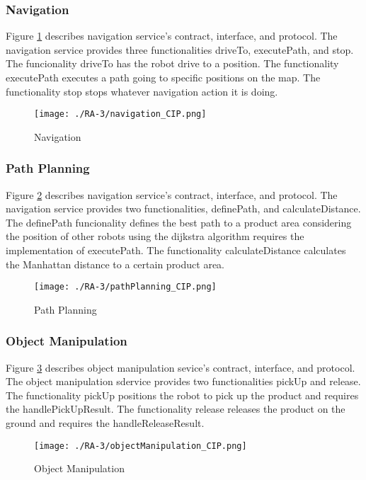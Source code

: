 \subsubsection{Navigation} %
Figure \ref{fig:navigation_cip} describes navigation service's contract, interface, and protocol. The navigation service provides three functionalities driveTo, executePath, and stop. The funcionality driveTo has the robot drive to a position. The functionality executePath executes a path going to specific positions on the map. The functionality stop stops whatever navigation action it is doing.
\begin{figure}[ht!]
 \centering
 \texttt{[image: ./RA-3/navigation\_CIP.png]}
 \caption{Navigation}
 \label{fig:navigation_cip}
\end{figure}

\subsubsection{Path Planning} %
Figure \ref{fig:pathplanning_cip} describes navigation service's contract, interface, and protocol. The navigation service provides two functionalities, definePath, and calculateDistance. The definePath funcionality defines the best path to a product area considering the position of other robots using the dijkstra algorithm requires the implementation of executePath. The functionality calculateDistance calculates the Manhattan distance to a certain product area.
\begin{figure}[ht!]
 \centering
 \texttt{[image: ./RA-3/pathPlanning\_CIP.png]}
 \caption{Path Planning}
 \label{fig:pathplanning_cip}
\end{figure}

\subsubsection{Object Manipulation} %
Figure \ref{fig:objectmanipulation_cip} describes object manipulation sevice's contract, interface, and protocol. The object manipulation sdervice provides two functionalities pickUp and release. The functionality pickUp positions the robot to pick up the product and requires the handlePickUpResult. The functionality release releases the product on the ground and requires the handleReleaseResult. 
\begin{figure}[ht!]
 \centering
 \texttt{[image: ./RA-3/objectManipulation\_CIP.png]}
 \caption{Object Manipulation}
 \label{fig:objectmanipulation_cip}
\end{figure}

